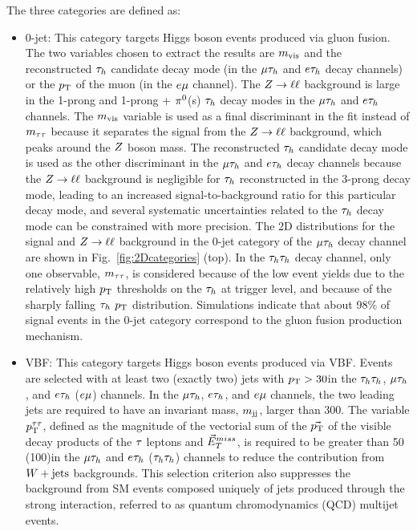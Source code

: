 The three categories are defined as:
\begin{itemize}
\item {0-jet}: This category targets Higgs boson events produced via gluon fusion.
The two variables chosen to extract the results are $m_\text{vis}$ and
the reconstructed $\tau_{h}$ candidate decay mode (in the $\mu\tau_{h}$ and $e\tau_{h}$ decay channels)
or the $p_\mathrm{T}$ of the muon (in the $e\mu$ channel). The $Z\to\ell\ell$ background is large in the 1-prong and 1-prong + $\pi^{0}$(s) $\tau_{h}$
decay modes in the
$\mu\tau_{h}$ and $e\tau_{h}$ channels.
The $m_\text{vis}$ variable is used as a final discriminant in the fit instead of $m_{\tau\tau}$ because it separates the signal from the $Z\to\ell\ell$ background, which peaks
around the $Z$ boson mass. The reconstructed $\tau_{h}$ candidate decay mode is used as the other discriminant in the $\mu\tau_{h}$ and $e\tau_{h}$ decay channels because the $Z\to\ell\ell$ background is negligible for $\tau_{h}$
reconstructed in the 3-prong decay mode, leading to an increased signal-to-background ratio for this particular decay mode, and several systematic uncertainties related to the $\tau_{h}$ decay mode can be constrained with more precision. The 2D distributions for the signal and $Z\to\ell\ell$ background
in the 0-jet category of the $\mu\tau_{h}$ decay channel are shown in Fig.~\ref{fig:2Dcategories} (top).
In the $\tau_{h}\tau_{h}$ decay channel, only one observable, $m_{\tau\tau}$, is considered because of the low event yields
due to the relatively high $p_\mathrm{T}$ thresholds on the $\tau_{h}$ at trigger level, and because of the sharply falling $\tau_{h}$ $p_\mathrm{T}$ distribution. Simulations indicate that about 98\% of signal events in the 0-jet category correspond to the gluon fusion production mechanism.\\
\item {VBF}: This category targets Higgs boson events produced via VBF.
Events are selected with at least two (exactly two) jets with $p_\mathrm{T}>30$\GeV in the
$\tau_{h}\tau_{h}$, $\mu\tau_{h}$, and $e\tau_{h}$ ($e\mu$) channels.
In the $\mu\tau_{h}$, $e\tau_{h}$, and $e\mu$ channels, the two leading jets are required to have an invariant mass, $m_\mathrm{jj}$, larger than 300\GeV. The variable $p_\mathrm{T}^{\tau\tau}$, defined as the magnitude of the vectorial sum of the $\vec{p_\mathrm{T}}$ of the visible decay products of the $\tau$ leptons and $\vec{E}^{miss}_T$, is required to be greater than 50 (100)\GeV in the $\mu\tau_{h}$
 and $e\tau_{h}$ ($\tau_{h}\tau_{h}$) channels to reduce the contribution from $W+\text{jets}$ backgrounds. This selection criterion also suppresses the background from SM events composed uniquely of jets produced through the strong interaction, referred to as quantum chromodynamics (QCD) multijet events.

\end{itemize}
